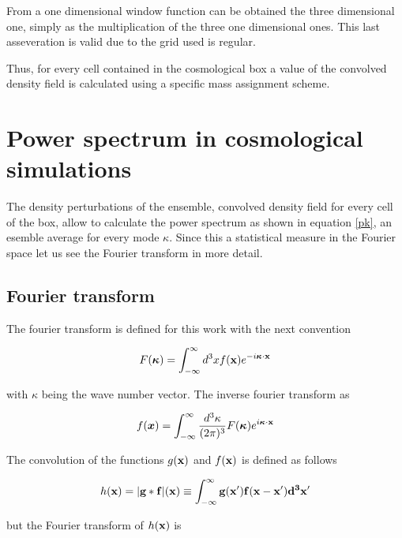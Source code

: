 From a one dimensional window function can be obtained the three dimensional one, simply as
the multiplication of the three one dimensional ones. This last asseveration is valid due to 
the grid used is regular. 

Thus, for every cell contained in the cosmological box a value of the convolved density 
field is calculated using a specific mass assignment scheme. 

\section{ Power spectrum in cosmological simulations }


The density perturbations of the ensemble, convolved density field for every cell 
of the box, allow to calculate the power spectrum as shown in equation \ref{pk},
an esemble average for every mode $\kappa$. Since this a statistical measure in
the Fourier space let us see the Fourier transform in more detail.

\subsection{Fourier transform}

The fourier transform is defined for this work with the next convention

\begin{equation}
F(\boldsymbol{\kappa}) = \int_{-\infty}^{\infty} d^3 x f(\textbf{x})e^{-i \boldsymbol{\kappa}\cdot\bf{x}	}
\label{FT}
\end{equation}

with $\kappa$ being the wave number vector. The inverse fourier transform as

\begin{equation}
f( \boldsymbol{x}) = \int_{-\infty}^{\infty} \frac{d^3 \kappa}{(2\pi)^3}  F(\boldsymbol{\kappa})e^{i \boldsymbol{\kappa}\cdot\bf{x}	}
\label{IFT}
\end{equation}

The convolution of the functions $g(\bf{x})$ and $f(\bf{x})$ is defined as follows

\[h(\bf{x}) = |g*f|(\bf{x})\equiv \int_{-\infty}^{\infty} g(\bf{x}')f(\bf{x} - \bf{x}') d^3 x' \]

but the Fourier transform of $h(\bf{x})$ is 


